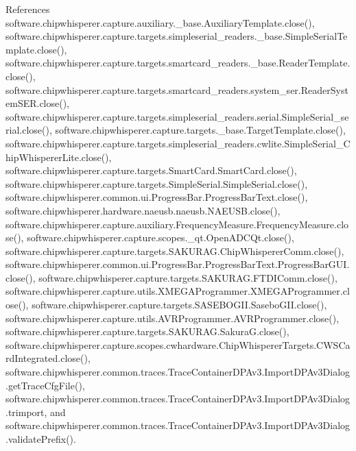 References software.\+chipwhisperer.\+capture.\+auxiliary.\+\_\+base.\+Auxiliary\+Template.\+close(), software.\+chipwhisperer.\+capture.\+targets.\+simpleserial\+\_\+readers.\+\_\+base.\+Simple\+Serial\+Template.\+close(), software.\+chipwhisperer.\+capture.\+targets.\+smartcard\+\_\+readers.\+\_\+base.\+Reader\+Template.\+close(), software.\+chipwhisperer.\+capture.\+targets.\+smartcard\+\_\+readers.\+system\+\_\+ser.\+Reader\+System\+S\+E\+R.\+close(), software.\+chipwhisperer.\+capture.\+targets.\+simpleserial\+\_\+readers.\+serial.\+Simple\+Serial\+\_\+serial.\+close(), software.\+chipwhisperer.\+capture.\+targets.\+\_\+base.\+Target\+Template.\+close(), software.\+chipwhisperer.\+capture.\+targets.\+simpleserial\+\_\+readers.\+cwlite.\+Simple\+Serial\+\_\+\+Chip\+Whisperer\+Lite.\+close(), software.\+chipwhisperer.\+capture.\+targets.\+Smart\+Card.\+Smart\+Card.\+close(), software.\+chipwhisperer.\+capture.\+targets.\+Simple\+Serial.\+Simple\+Serial.\+close(), software.\+chipwhisperer.\+common.\+ui.\+Progress\+Bar.\+Progress\+Bar\+Text.\+close(), software.\+chipwhisperer.\+hardware.\+naeusb.\+naeusb.\+N\+A\+E\+U\+S\+B.\+close(), software.\+chipwhisperer.\+capture.\+auxiliary.\+Frequency\+Measure.\+Frequency\+Measure.\+close(), software.\+chipwhisperer.\+capture.\+scopes.\+\_\+qt.\+Open\+A\+D\+C\+Qt.\+close(), software.\+chipwhisperer.\+capture.\+targets.\+S\+A\+K\+U\+R\+A\+G.\+Chip\+Whisperer\+Comm.\+close(), software.\+chipwhisperer.\+common.\+ui.\+Progress\+Bar.\+Progress\+Bar\+Text.\+Progress\+Bar\+G\+U\+I.\+close(), software.\+chipwhisperer.\+capture.\+targets.\+S\+A\+K\+U\+R\+A\+G.\+F\+T\+D\+I\+Comm.\+close(), software.\+chipwhisperer.\+capture.\+utils.\+X\+M\+E\+G\+A\+Programmer.\+X\+M\+E\+G\+A\+Programmer.\+close(), software.\+chipwhisperer.\+capture.\+targets.\+S\+A\+S\+E\+B\+O\+G\+I\+I.\+Sasebo\+G\+I\+I.\+close(), software.\+chipwhisperer.\+capture.\+utils.\+A\+V\+R\+Programmer.\+A\+V\+R\+Programmer.\+close(), software.\+chipwhisperer.\+capture.\+targets.\+S\+A\+K\+U\+R\+A\+G.\+Sakura\+G.\+close(), software.\+chipwhisperer.\+capture.\+scopes.\+cwhardware.\+Chip\+Whisperer\+Targets.\+C\+W\+S\+Card\+Integrated.\+close(), software.\+chipwhisperer.\+common.\+traces.\+Trace\+Container\+D\+P\+Av3.\+Import\+D\+P\+Av3\+Dialog.\+get\+Trace\+Cfg\+File(), software.\+chipwhisperer.\+common.\+traces.\+Trace\+Container\+D\+P\+Av3.\+Import\+D\+P\+Av3\+Dialog.\+trimport, and software.\+chipwhisperer.\+common.\+traces.\+Trace\+Container\+D\+P\+Av3.\+Import\+D\+P\+Av3\+Dialog.\+validate\+Prefix().


